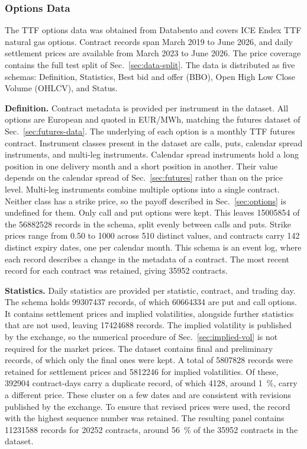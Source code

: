\subsubsection{Options Data}\label{sec:options-data}
The TTF options data was obtained from Databento and covers ICE Endex TTF natural gas options. Contract records span March 2019 to June 2026, and daily settlement prices are available from March 2023 to June 2026. The price coverage contains the full test split of Sec.~\ref{sec:data-split}. The data is distributed as five schemas: Definition, Statistics, Best bid and offer (BBO), Open High Low Close Volume (OHLCV), and Status.

\textbf{Definition.} Contract metadata is provided per instrument in the dataset. All options are European and quoted in EUR/MWh, matching the futures dataset of Sec.~\ref{sec:futures-data}. The underlying of each option is a monthly TTF futures contract. Instrument classes present in the dataset are calls, puts, calendar spread instruments, and multi-leg instruments. Calendar spread instruments hold a long position in one delivery month and a short position in another. Their value depends on the calendar spread of Sec.~\ref{sec:futures} rather than on the price level. Multi-leg instruments combine multiple options into a single contract. Neither class has a strike price, so the payoff described in Sec.~\ref{sec:options} is undefined for them. Only call and put options were kept. This leaves \num{15005854} of the \num{56882528} records in the schema, split evenly between calls and puts. Strike prices range from \SI{0.50}{\eurmwh} to \SI{1000}{\eurmwh} across \num{510} distinct values, and contracts carry \num{142} distinct expiry dates, one per calendar month. This schema is an event log, where each record describes a change in the metadata of a contract. The most recent record for each contract was retained, giving \num{35952} contracts.

\textbf{Statistics.} Daily statistics are provided per statistic, contract, and trading day. The schema holds \num{99307437} records, of which \num{60664334} are put and call options. It contains settlement prices and implied volatilities, alongside further statistics that are not used, leaving \num{17424688} records. The implied volatility is published by the exchange, so the numerical procedure of Sec.~\ref{sec:implied-vol} is not required for the market prices. The dataset contains final and preliminary records, of which only the final ones were kept. A total of \num{5807828} records were retained for settlement prices and \num{5812246} for implied volatilities. Of these, \num{392904} contract-days carry a duplicate record, of which \num{4128}, around \SI{1}{\percent}, carry a different price. These cluster on a few dates and are consistent with revisions published by the exchange. To ensure that revised prices were used, the record with the highest sequence number was retained. The resulting panel contains \num{11231588} records for \num{20252} contracts, around \SI{56}{\percent} of the \num{35952} contracts in the dataset.

